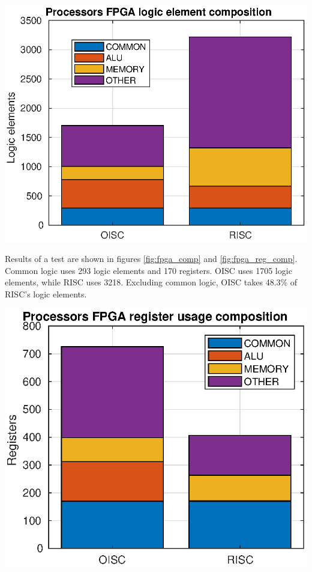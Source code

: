 \begin{colfigure}
	\centering
	\includegraphics[width=\linewidth]{../tests/fpga_comp.eps}
	\label{fig:fpga_comp}
\end{colfigure}

Results of a test are shown in figures \ref{fig:fpga_comp} and \ref{fig:fpga_reg_comp}. Common logic uses 293 logic elements and 170 registers. OISC uses 1705 logic elements, while RISC uses 3218. Excluding common logic, OISC takes 48.3\% of RISC's logic elements.


\begin{colfigure}
	\centering
	\includegraphics[width=\linewidth]{../tests/fpga_reg_comp.eps}
	\label{fig:fpga_reg_comp}
\end{colfigure}

